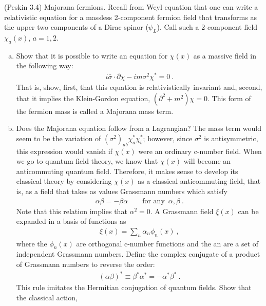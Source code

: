 \documentclass[12pt]{report}
\newcounter{problemname}
\numberwithin{problemname}{chapter}
\newenvironment{problem}{\vspace{1em}\stepcounter{problemname}\par\noindent {\large\textbf{\textsc{Problem \thechapter.\arabic{problemname}}}} \par\color{blue}}{\par}
\begin{document}
\begin{problem}
(Peskin 3.4) Majorana fermions. Recall from Weyl equation that one can write a
relativistic equation for a massless 2-component fermion field that transforms as the upper two components of a Dirac spinor ($\psi_L$). Call such a 2-component field $\chi_a(x)$, $a=1,2$.
\begin{enumerate}[(a)]
    \item Show that it is possible to write an equation for $\chi (x)$ as a massive field in the following way:
    \begin{align}
        i\bar{\sigma}\cdot\partial\chi-im\sigma^2\chi^*=0\ . \label{Eq.MajoranaEquation}
    \end{align}
    That is, show, first, that this equation is relativistically invariant and, second, that it implies the Klein-Gordon equation, $(\partial^2+m^2)\chi=0$. This form of the fermion mass is called a Majorana mass term.
    \item Does the Majorana equation follow from a Lagrangian? The mass term would seem to be the variation of $(\sigma^2)_{ab}\chi^*_{a}\chi^*_{b}$; however, since $\sigma^2$ is antisymmetric, this expression would vanish if $\chi (x)$ were an ordinary c-number field. When we go to quantum field theory, we know that $\chi (x)$ will become an anticommuting quantum field. Therefore, it makes sense to develop its classical theory by considering $\chi (x)$ as a classical anticommuting field, that is, as a field that takes as values Grassmann numbers which satisfy
    \begin{align}
        \alpha\beta=-\beta\alpha\quad\quad \text{for any}\enspace\alpha, \beta\ .
    \end{align}
     Note that this relation implies that $\alpha^2=0$. A Grassmann field $\xi (x)$ can be expanded in a basis of functions as
     \begin{align}
         \xi (x)=\sum_n\alpha_n\phi_n(x)\ ,
     \end{align}
      where the $\phi_n(x)$ are orthogonal c-number functions and the an are a set of independent Grassmann numbers. Define the complex conjugate of a product of Grassmann numbers to reverse the order:
      \begin{align}
          (\alpha\beta)^*\equiv\beta^*\alpha^*=-\alpha^*\beta^*\ .
      \end{align}
      This rule imitates the Hermitian conjugation of quantum fields. Show that the classical action,
      \begin{align}

\end{align}
\end{enumerate}
\end{problem}
\end{document}
